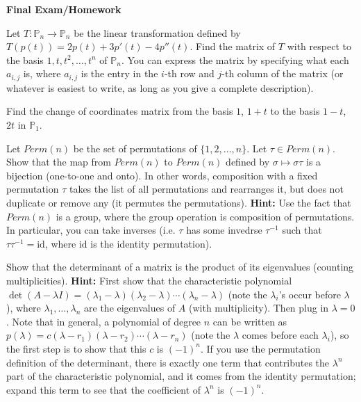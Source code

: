 \documentclass{article}
\begin{document}

\textbf{Final Exam/Homework}

\begin{Exercise}
    Let $T : \mathbb{P}_n \to \mathbb{P}_n$ be the linear transformation defined by $T(p(t)) = 2p(t) + 3p'(t) - 4p''(t)$. Find the matrix of $T$ with respect to the basis $1, t, t^2, \ldots, t^n$ of $\mathbb{P}_n$. You can express the matrix by specifying what each $a_{i,j}$ is, where $a_{i,j}$ is the entry in the $i$-th row and $j$-th column of the matrix (or whatever is easiest to write, as long as you give a complete description).
\end{Exercise}

\begin{Exercise}
    Find the change of coordinates matrix from the basis $1$, $1+t$ to the basis $1-t$, $2t$ in $\mathbb{P}_1$.
\end{Exercise}

\begin{Exercise} Let $Perm(n)$ be the set of permutations of $\{1,2,\ldots,n\}$. Let $\tau \in Perm(n)$. Show that the map from $Perm(n)$ to $Perm(n)$ defined by $\sigma \mapsto \sigma \tau$ is a bijection (one-to-one and onto). In other words, composition with a fixed permutation $\tau$ takes the list of all permutations and rearranges it, but does not duplicate or remove any (it permutes the permutations). \textbf{Hint:} Use the fact that $Perm(n)$ is a group, where the group operation is composition of permutations. In particular, you can take inverses (i.e. $\tau$ has some invedrse $\tau^{-1}$ such that $\tau \tau^{-1} = \text{id}$, where $\text{id}$ is the identity permutation).
\end{Exercise}

\begin{Exercise}
    Show that the determinant of a matrix is the product of its eigenvalues (counting multiplicities). 
\textbf{Hint:} First show that the characteristic polynomial $\det(A-\lambda I) = (\lambda_1 - \lambda)(\lambda_2 - \lambda)\cdots(\lambda_n - \lambda)$ (note the $\lambda_i$'s occur before $\lambda$), where $\lambda_1, \ldots, \lambda_n$ are the eigenvalues of $A$ (with multiplicity). Then plug in $\lambda = 0$. Note that in general, a polynomial of degree $n$ can be written as $p(\lambda) = c(\lambda - r_1)(\lambda - r_2)\cdots(\lambda - r_n)$ (note the $\lambda$ comes before each $\lambda_i$), so the first step is to show that this $c$ is $(-1)^n$. If you use the permutation definition of the determinant, there is exactly one term that contributes the $\lambda^n$ part of the characteristic polynomial, and it comes from the identity permutation; expand this term to see that the coefficient of $\lambda^n$ is $(-1)^n$.
\end{Exercise}
\end{document}
